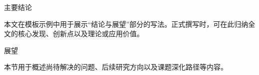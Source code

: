 \label{chap:conclusion}

{\kaishu\fontsize{14bp}{28bp}\quad 主要结论\par}
\vspace{7pt}
本文在模板示例中用于展示“结论与展望”部分的写法。正式撰写时，可在此归纳全文的核心发现、创新点以及理论或应用价值。

{\kaishu\fontsize{14bp}{28bp}\quad 展望\par}
\vspace{7pt}
本节用于概述尚待解决的问题、后续研究方向以及课题深化路径等内容。